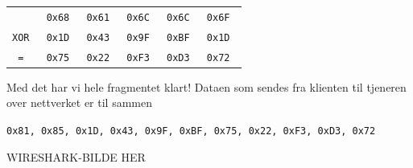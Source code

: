 \documentclass{article}
\newcommand{\code}[1]{\colorbox{light-gray}{\texttt{#1}}}
\begin{document}
\begin{center}
    \begin{tabular*}{.492\linewidth}[H]{cccccc}
        & \tt0x68 & \tt0x61 & \tt0x6C & \tt0x6C & \tt0x6F \\
        \tt XOR & \tt0x1D & \tt0x43 & \tt0x9F & \tt0xBF & \tt0x1D \\
        \hline
        \tt = & \tt0x75 & \tt0x22 & \tt0xF3 & \tt0xD3 & \tt0x72 \\
        \hline
    \end{tabular*}
\end{center}

Med det har vi hele fragmentet klart! Dataen som sendes fra klienten til tjeneren over nettverket er til sammen 

\begin{center}
    \code{0x81, 0x85, 0x1D, 0x43, 0x9F, 0xBF, 0x75, 0x22, 0xF3, 0xD3, 0x72}
\end{center}

WIRESHARK-BILDE HER
\end{document}
